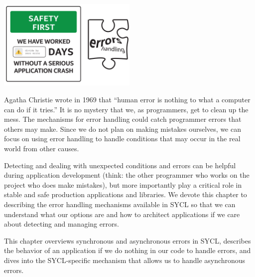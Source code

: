 \begin{center}
	\includegraphics[width=0.5\textwidth]{content/chapter-5/images/1}
\end{center}

Agatha Christie wrote in 1969 that “human error is nothing to what a computer can do if it tries.” It is no mystery that we, as programmers, get to clean up the mess. The mechanisms for error handling could catch programmer errors that others may make. Since we do not plan on making mistakes ourselves, we can focus on using error handling to handle conditions that may occur in the real world from other causes.\par

Detecting and dealing with unexpected conditions and errors can be helpful during application development (think: the other programmer who works on the project who does make mistakes), but more importantly play a critical role in stable and safe production applications and libraries. We devote this chapter to describing the error handling mechanisms available in SYCL so that we can understand what our options are and how to architect applications if we care about detecting and managing errors.\par

This chapter overviews synchronous and asynchronous errors in SYCL, describes the behavior of an application if we do nothing in our code to handle errors, and dives into the SYCL-specific mechanism that allows us to handle asynchronous errors.\par